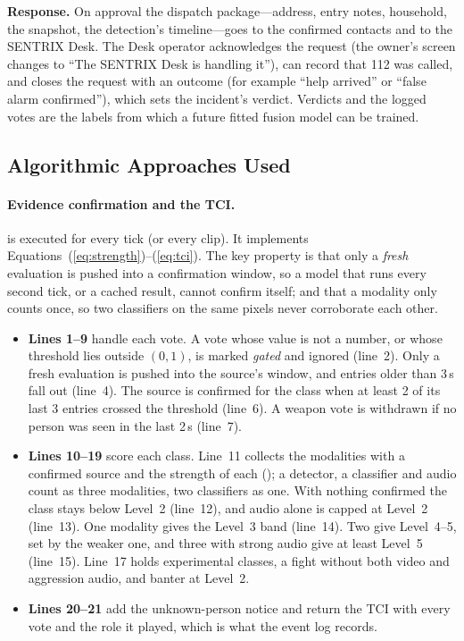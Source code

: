 \textbf{Response.} On approval the dispatch package---address, entry notes, household, the snapshot, the detection's timeline---goes to the confirmed contacts and to the SENTRIX Desk. The Desk operator acknowledges the request (the owner's screen changes to ``The SENTRIX Desk is handling it''), can record that 112 was called, and closes the request with an outcome (for example ``help arrived'' or ``false alarm confirmed''), which sets the incident's verdict. Verdicts and the logged votes are the labels from which a future fitted fusion model can be trained.

\subsection{Algorithmic Approaches Used}
\label{sec:algorithms}

\paragraph{Evidence confirmation and the TCI.}  is executed for every tick (or every clip). It implements Equations~(\ref{eq:strength})--(\ref{eq:tci}). The key property is that only a \emph{fresh} evaluation is pushed into a confirmation window, so a model that runs every second tick, or a cached result, cannot confirm itself; and that a modality only counts once, so two classifiers on the same pixels never corroborate each other.
\begin{itemize}
\item \textbf{Lines 1--9} handle each vote. A vote whose value is not a number, or whose threshold lies outside $(0,1)$, is marked \emph{gated} and ignored (line~2). Only a fresh evaluation is pushed into the source's window, and entries older than 3\,s fall out (line~4). The source is confirmed for the class when at least 2 of its last 3 entries crossed the threshold (line~6). A weapon vote is withdrawn if no person was seen in the last 2\,s (line~7).
\item \textbf{Lines 10--19} score each class. Line~11 collects the modalities with a confirmed source and the strength of each (); a detector, a classifier and audio count as three modalities, two classifiers as one. With nothing confirmed the class stays below Level~2 (line~12), and audio alone is capped at Level~2 (line~13). One modality gives the Level~3 band (line~14). Two give Level~4--5, set by the weaker one, and three with strong audio give at least Level~5 (line~15). Line~17 holds experimental classes, a fight without both video and aggression audio, and banter at Level~2.
\item \textbf{Lines 20--21} add the unknown-person notice and return the TCI with every vote and the role it played, which is what the event log records.
\end{itemize}

